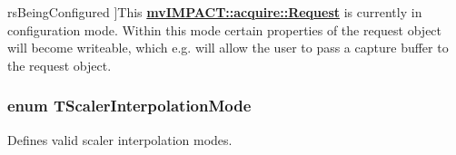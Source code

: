 \begin{Desc}
\begin{description}
{\hypertarget{group___common_interface_ggacaa15d9102d56c38e659c31c678a640daa5053db62c6c7458401bde7efd24a307}{rs\+Being\+Configured}\label{group___common_interface_ggacaa15d9102d56c38e659c31c678a640daa5053db62c6c7458401bde7efd24a307}
}]This {\bfseries \hyperlink{classmv_i_m_p_a_c_t_1_1acquire_1_1_request}{mv\+I\+M\+P\+A\+C\+T\+::acquire\+::\+Request}} is currently in configuration mode. Within this mode certain properties of the request object will become writeable, which e.\+g. will allow the user to pass a capture buffer to the request object. \end{description}
\end{Desc}
\hypertarget{group___common_interface_gae0752aaeb2b62ddbcf4782bbf0205f41}{
\subsubsection[{T\+Scaler\+Interpolation\+Mode}]{\setlength{\rightskip}{0pt plus 5cm}enum {\bf T\+Scaler\+Interpolation\+Mode}}}\label{group___common_interface_gae0752aaeb2b62ddbcf4782bbf0205f41}


Defines valid scaler interpolation modes. 

